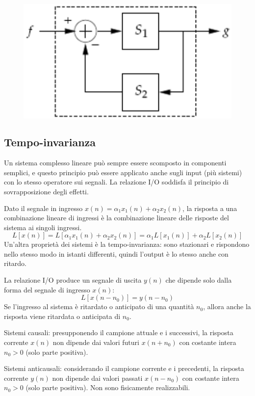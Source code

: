 \begin{figure}[h]
	\centering
	\includegraphics[scale=0.4]{Lezioni/Immagini/retroazione}
\end{figure}

\subsection{Tempo-invarianza}
Un sistema complesso lineare può sempre essere scomposto in componenti semplici, e questo principio può essere applicato anche sugli input (più sistemi) con lo stesso operatore sui segnali. La relazione I/O soddisfa il principio di sovrapposizione degli effetti. 

Dato il segnale in ingresso $x(n) = \alpha_1x_1(n) + \alpha_2x_2(n)$, la risposta a una combinazione lineare di ingressi è la combinazione lineare delle risposte del sistema ai singoli ingressi.
$$L[x(n)] = L[\alpha_1x_1(n) + \alpha_2x_2(n)] = \alpha_1L[x_1(n)] + \alpha_2L[x_2(n)]$$
Un'altra proprietà dei sistemi è la tempo-invarianza: sono stazionari e rispondono nello stesso modo in istanti differenti, quindi l'output è lo stesso anche con ritardo. 

La relazione I/O produce un segnale di uscita $y(n)$ che dipende solo dalla forma del segnale di ingresso $x(n)$:
$$L[x(n - n_0)] = y(n - n_0)$$
Se l'ingresso al sistema è ritardato o anticipato di una quantità $n_0$, allora anche la risposta viene ritardata o anticipata di $n_0$.

Sistemi causali: presupponendo il campione attuale e i successivi, la risposta corrente $x(n)$ non dipende dai valori futuri $x(n + n_0)$ con costante intera $n_0 > 0$ (solo parte positiva).

Sistemi anticausali: considerando il campione corrente e i precedenti, la risposta corrente $y(n)$ non dipende dai valori passati $x(n - n_0)$ con costante intera $n_0 > 0$ (solo parte positiva). Non  sono fisicamente realizzabili.

